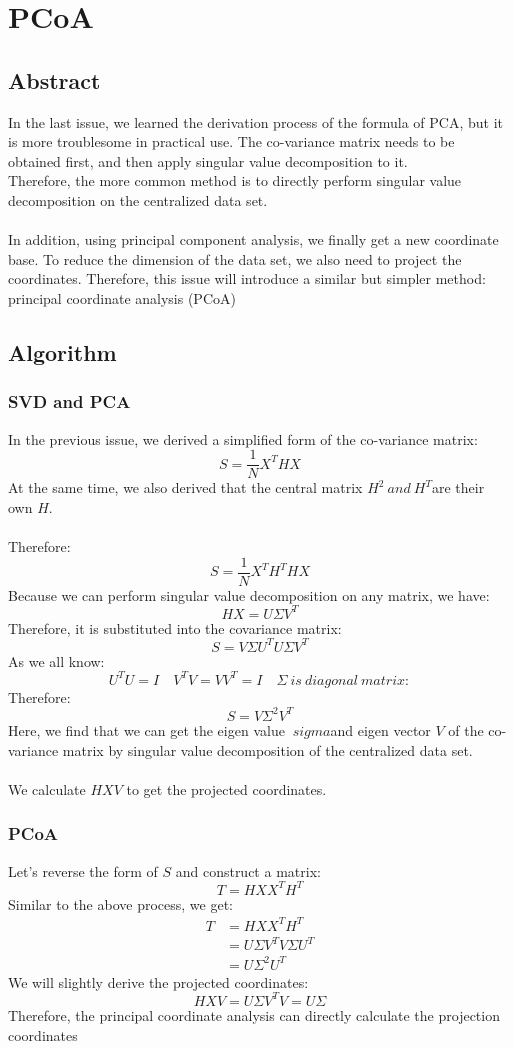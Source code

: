 \documentclass{report}
\begin{document}
\section{PCoA}
\subsection{Abstract}
In the last issue, we learned the derivation process of the formula of PCA, but it is more troublesome in practical use. The co-variance matrix needs to be obtained first, and then apply singular value decomposition to it. \\
Therefore, the more common method is to directly perform singular value decomposition on the centralized data set.\\\\
In addition, using principal component analysis, we finally get a new coordinate base. To reduce the dimension of the data set, we also need to project the coordinates. Therefore, this issue will introduce a similar but simpler method: principal coordinate analysis (PCoA)
\subsection{Algorithm}
\subsubsection{SVD and PCA}
In the previous issue, we derived a simplified form of the co-variance matrix:
$$
S=\frac{1}{N} X^T H X
$$
At the same time, we also derived that the central matrix $H^2\ and\ H^T $are their own $H $.\\\\
Therefore:
$$
S=\frac{1}{N} X^T H^T H X
$$
Because we can perform singular value decomposition on any matrix, we have:
$$
HX = U \Sigma V^T
$$
Therefore, it is substituted into the covariance matrix:
$$
S = V \Sigma U^T U \Sigma V^T
$$
As we all know:
$$
U^T U=I \quad V^T V = V V^T= I \quad \Sigma \ is \ diagonal\ matrix:
$$
Therefore:
$$
S=V\Sigma ^2 V^T
$$
Here, we find that we can get the eigen value $\ sigma $and eigen vector $V $ of the co-variance matrix by singular value decomposition of the centralized data set.\\\\
We calculate $HXV $ to get the projected coordinates.
\subsubsection{PCoA}
Let's reverse the form of $S $ and construct a matrix:
$$
T=HXX^TH^T
$$
Similar to the above process, we get:
$$
\begin{aligned}
T&=HXX^TH^T\\
&=U\Sigma V^T V\Sigma U^T\\
&=U\Sigma^2 U^T
\end{aligned}
$$
We will slightly derive the projected coordinates:
$$
HXV=U\Sigma V^TV=U\Sigma
$$
Therefore, the principal coordinate analysis can directly calculate the projection coordinates
\end{document}
